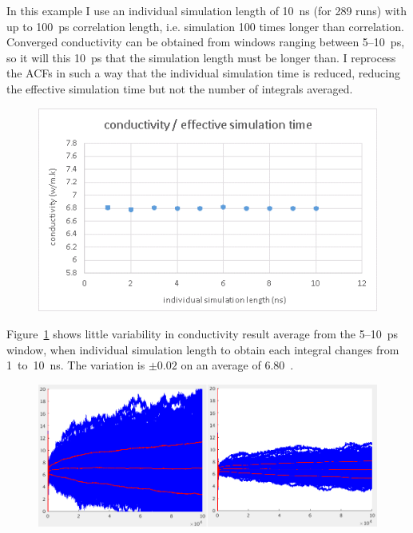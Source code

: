 In this example I use an individual simulation length of 10~ns (for 289 runs) with up to 100~ps correlation length, i.e. simulation 100 times longer than correlation. Converged conductivity can be obtained from windows ranging between 5--10~ps, so it will this 10~ps that the simulation length must be longer than. I reprocess the ACFs in such a way that the individual simulation time is reduced, reducing the effective simulation time but not the number of integrals averaged.

\begin{figure}[hb!]
\includegraphics[width=\linewidth]{Figures/gk_sim_length_conv_graph.png}
\caption[gk simulation length convergence]{}
\label{fig:gk_int_4000_sim_length_conv_graph}
\end{figure}

Figure~\ref{fig:gk_int_4000_sim_length_conv_graph} shows little variability in conductivity result average from the 5--10~ps window, when individual simulation length to obtain each integral changes from 1~to~10~ns. The variation is $\pm0.02$  on an average of 6.80~\wmk. 

\begin{figure}[hb!]
\includegraphics[width=\linewidth]{Figures/gk_int_4000_comp_sim_length.png}
\caption[gk integrals, simulation length convergence]{}
\label{fig:gk_int_4000_sim_length_comp}
\end{figure}

